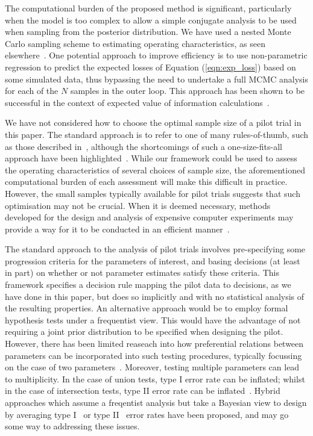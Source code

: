 \documentclass{article} %
\begin{document}
The computational burden of the proposed method is significant, particularly when the model is too complex to allow a simple conjugate analysis to be used when sampling from the posterior distribution. We have used a nested Monte Carlo sampling scheme to estimating operating characteristics, as seen elsewhere~\cite{Wang2002, OHagan2005, Sutton2007}. One potential approach to improve efficiency is to use non-parametric regression to predict the expected losses of Equation (\ref{eqn:exp_loss}) based on some simulated data, thus bypassing the need to undertake a full MCMC analysis for each of the $N$ samples in the outer loop. This approach has been shown to be successful in the context of expected value of information calculations~\cite{Strong2014, Strong2015}.


We have not considered how to choose the optimal sample size of a pilot trial in this paper. The standard approach is to refer to one of many rules-of-thumb, such as those described in~\cite{Lancaster2004, Julious2005, Teare2014}, although the shortcomings of such a one-size-fits-all approach have been highlighted~\cite{Whitehead2015}. While our framework could be used to assess the operating characteristics of several choices of sample size, the aforementioned computational burden of each assessment will make this difficult in practice. However, the small samples typically available for pilot trials suggests that such optimisation may not be crucial. When it is deemed necessary, methods developed for the design and analysis of expensive computer experiments may provide a way for it to be conducted in an efficient manner~\cite{Jones2001}.

The standard approach to the analysis of pilot trials involves pre-specifying some progression criteria for the parameters of interest, and basing decisions (at least in part) on whether or not parameter estimates satisfy these criteria. This framework specifies a decision rule mapping the pilot data to decisions, as we have done in this paper, but does so implicitly and with no statistical analysis of the resulting properties. An alternative approach would be to employ formal hypothesis tests under a frequentist view. This would have the advantage of not requiring a joint prior distribution to be specified when designing the pilot. However, there has been limited reaseach into how preferential relations between parameters can be incorporated into such testing procedures, typically focussing on the case of two parameters~\cite{Conaway1996, Thall2008}. Moreover, testing multiple parameters can lead to multiplicity. In the case of union tests, type I error rate can be inflated; whilst in the case of intersection tests, type II error rate can be inflated~\cite{Senn2007}. Hybrid approaches which assume a freqentist analysis but take a Bayesian view to design by averaging type I~\cite{Chuang-Stein2007} or type II~\cite{Spiegelhalter1986} error rates have been proposed, and may go some way to addressing these issues.
\end{document}
